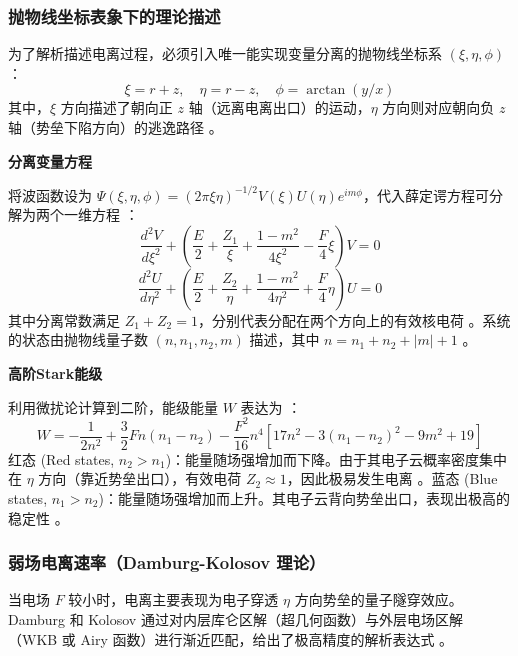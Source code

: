 \documentclass[../main.tex]{subfiles}
\begin{document}
\subsubsection{抛物线坐标表象下的理论描述}

为了解析描述电离过程，必须引入唯一能实现变量分离的抛物线坐标系 $(\xi, \eta, \phi)$ ：
   \begin{equation}
   \xi = r + z, \quad \eta = r - z, \quad \phi = \arctan(y/x)
   \end{equation}
   其中，$\xi$ 方向描述了朝向正 $z$ 轴（远离电离出口）的运动，$\eta$ 方向则对应朝向负 $z$ 轴（势垒下陷方向）的逃逸路径 。

\textbf{分离变量方程}

将波函数设为 $\Psi(\xi,\eta,\phi) = (2\pi\xi\eta)^{-1/2}V(\xi)U(\eta)e^{im\phi}$，代入薛定谔方程可分解为两个一维方程 ：
\begin{equation}
\frac{d^2V}{d\xi^2} + \left( \frac{E}{2} + \frac{Z_1}{\xi} + \frac{1-m^2}{4\xi^2} - \frac{F}{4}\xi \right)V = 0
\end{equation}
\begin{equation}
\frac{d^2U}{d\eta^2} + \left( \frac{E}{2} + \frac{Z_2}{\eta} + \frac{1-m^2}{4\eta^2} + \frac{F}{4}\eta \right)U = 0
\end{equation}
其中分离常数满足 $Z_1 + Z_2 = 1$，分别代表分配在两个方向上的有效核电荷 。系统的状态由抛物线量子数 $(n, n_1, n_2, m)$ 描述，其中 $n = n_1 + n_2 + |m| + 1$ 。

\textbf{高阶Stark能级}

利用微扰论计算到二阶，能级能量 $W$ 表达为 ：
\begin{equation}
W = -\frac{1}{2n^2} + \frac{3}{2}Fn(n_1-n_2) - \frac{F^2}{16}n^4[17n^2 - 3(n_1-n_2)^2 - 9m^2 + 19]
\end{equation}红态 (Red states, $n_2 > n_1$)：能量随场强增加而下降。由于其电子云概率密度集中在 $\eta$ 方向（靠近势垒出口），有效电荷 $Z_2 \approx 1$，因此极易发生电离 。蓝态 (Blue states, $n_1 > n_2$)：能量随场强增加而上升。其电子云背向势垒出口，表现出极高的稳定性 。

\subsubsection{弱场电离速率（Damburg-Kolosov 理论）}

当电场 $F$ 较小时，电离主要表现为电子穿透 $\eta$ 方向势垒的量子隧穿效应。Damburg 和 Kolosov \cite{damburg1976hydrogen}通过对内层库仑区解（超几何函数）与外层电场区解（WKB 或 Airy 函数）进行渐近匹配，给出了极高精度的解析表达式 。
\end{document}
